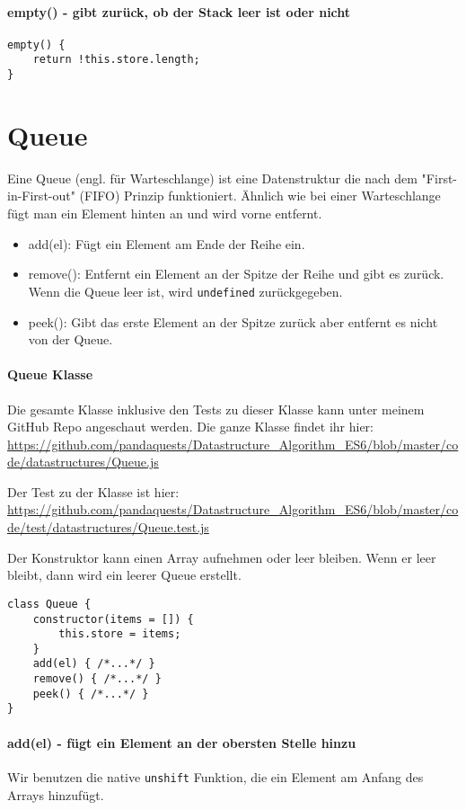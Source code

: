 \documentclass[babel]{book}
\begin{document}
\paragraph{empty() - gibt zurück, ob der Stack leer ist oder nicht} 
\begin{lstlisting}[caption=Array Konstruktor]
empty() {
	return !this.store.length;
}
\end{lstlisting}

\section{Queue}
Eine Queue (engl. für Warteschlange) ist eine Datenstruktur die nach dem "First-in-First-out" (FIFO) Prinzip funktioniert. Ähnlich wie bei einer Warteschlange fügt man ein Element hinten an und wird vorne entfernt.

\begin{itemize} 
	\item add(el): Fügt ein Element am Ende der Reihe ein.
	\item remove(): Entfernt ein Element an der Spitze der Reihe und gibt es zurück. Wenn die Queue leer ist, wird \lstinline|undefined| zurückgegeben.
	\item peek(): Gibt das erste Element an der Spitze zurück aber entfernt es nicht von der Queue.
\end{itemize}

\paragraph{Queue Klasse}
Die gesamte Klasse inklusive den Tests zu dieser Klasse kann unter meinem GitHub Repo angeschaut werden. Die ganze Klasse findet ihr hier: \url{https://github.com/pandaquests/Datastructure_Algorithm_ES6/blob/master/code/datastructures/Queue.js}

Der Test zu der Klasse ist hier: \url{https://github.com/pandaquests/Datastructure_Algorithm_ES6/blob/master/code/test/datastructures/Queue.test.js}

Der Konstruktor kann einen Array aufnehmen oder leer bleiben. Wenn er leer bleibt, dann wird ein leerer Queue erstellt.

\begin{lstlisting}[caption=Array Konstruktor]
class Queue {
	constructor(items = []) {
		this.store = items;
	}
	add(el) { /*...*/ }
	remove() { /*...*/ }
	peek() { /*...*/ }
}
\end{lstlisting}

\paragraph{add(el) - fügt ein Element an der obersten Stelle hinzu} Wir benutzen die native \lstinline|unshift| Funktion, die ein Element am Anfang des Arrays hinzufügt.
\end{document}
